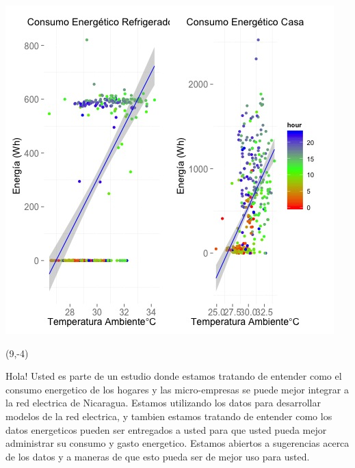 \documentclass{article}\usepackage[]{graphicx}\usepackage[]{color}
\newenvironment{knitrout}{}{} %
\begin{document}
\begin{knitrout}
\color{fgcolor}
\includegraphics[scale=0.75]{figure/A11_correlaciones} 
\end{knitrout}

 \begin{textblock}{1}(9,-4)
\begin{minipage}{20em}
\begingroup

\endgroup
\end{minipage}
\end{textblock}

\vspace{70px}
\begin{knitrout}
Hola! Usted es parte de un estudio donde estamos tratando de entender como el consumo energetico de los hogares y las micro-empresas se puede mejor integrar a la red electrica de Nicaragua. Estamos utilizando los datos para desarrollar modelos de la red electrica, y tambien estamos tratando de entender como los datos energeticos pueden ser entregados a usted para que usted pueda mejor administrar su consumo y gasto energetico.  Estamos abiertos a sugerencias acerca de los datos y a maneras de que esto pueda ser de mejor uso para usted.
\end{knitrout}
\end{document}
